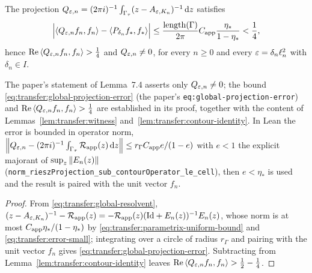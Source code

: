 \begin{lemma}
  \label{lem:global-riesz-nonzero}
  \leanok
  The projection
  $Q_{\varepsilon,n}=(2\pi i)^{-1}\int_{\Gamma_\tau}(z-A_{\varepsilon,K_n})^{-1}\,\mathrm{d} z$ satisfies
  \begin{equation}
    \Bigl|\left\langle Q_{\varepsilon,n}f_n,f_n\right\rangle-\left\langle P_{\delta_n}f_*,f_*\right\rangle\Bigr|
      \leq\frac{\operatorname{length}(\Gamma)}{2\pi}C_{\rm app}
        \frac{\eta_*}{1-\eta_*}<\frac14,
    \label{eq:transfer:global-projection-error}
  \end{equation}
  hence $\operatorname{Re}\left\langle Q_{\varepsilon,n}f_n,f_n\right\rangle>\tfrac14$ and $Q_{\varepsilon,n}\neq0$, for every $n\geq0$
  and every $\varepsilon=\delta_n\ell_n^2$ with $\delta_n\in I$.
\end{lemma}

The paper's statement of Lemma~7.4 asserts only $Q_{\varepsilon,n}\neq0$; the bound
\eqref{eq:transfer:global-projection-error} (the paper's \texttt{eq:global-projection-error})
and $\operatorname{Re}\left\langle Q_{\varepsilon,n}f_n,f_n\right\rangle>\tfrac14$ are established in its proof, together with
the content of Lemmas~\ref{lem:transfer:witness} and~\ref{lem:transfer:contour-identity}.
In Lean the error is bounded in operator norm,
$\left\|Q_{\varepsilon,n}-(2\pi i)^{-1}\int_{\Gamma_\tau}\mathcal{R}_{\rm app}(z)\,\mathrm{d} z\right\|
\leq r_\Gamma C_{\rm app}e/(1-e)$ with $e<1$ the explicit majorant of
$\sup_{z}\left\|E_n(z)\right\|$ (\texttt{norm\_rieszProjection\_sub\_contourOperator\_le\_cell}),
then $e<\eta_*$ is used and the result is paired with the unit vector $f_n$.

\begin{proof}
  \leanok
  From \eqref{eq:transfer:global-resolvent},
  $(z-A_{\varepsilon,K_n})^{-1}-\mathcal{R}_{\rm app}(z)=-\mathcal{R}_{\rm app}(z)(\mathrm{Id}+E_n(z))^{-1}E_n(z)$, whose
  norm is at most $C_{\rm app}\eta_*/(1-\eta_*)$ by
  \eqref{eq:transfer:parametrix-uniform-bound} and
  \eqref{eq:transfer:error-small}; integrating over a circle of radius $r_\Gamma$ and
  pairing with the unit vector $f_n$ gives
  \eqref{eq:transfer:global-projection-error}.  Subtracting from
  Lemma~\ref{lem:transfer:contour-identity} leaves
  $\operatorname{Re}\left\langle Q_{\varepsilon,n}f_n,f_n\right\rangle>\tfrac12-\tfrac14$.
\end{proof}


